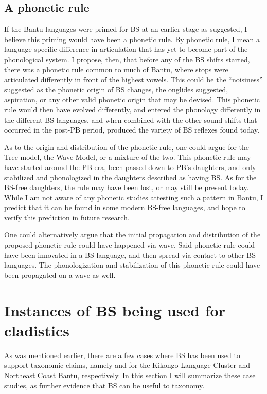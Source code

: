 \documentclass[output=paper,colorlinks,citecolor=brown
]{langscibook}
\begin{document}
\subsection{A phonetic rule}

If the Bantu languages were primed for BS at an earlier stage as \citet{bostoen2008} suggested, I believe this priming would have been a phonetic rule. By phonetic rule, I mean a language-specific difference in articulation that has yet to become part of the phonological system. I propose, then, that before any of the BS shifts started, there was a phonetic rule common to much of Bantu, where stops were articulated differently in front of the highest vowels. This could be the “noisiness” \citet{hyman2003} suggested as the phonetic origin of BS changes, the onglides \citet{Janson2007} suggested, aspiration, or any other valid phonetic origin that may be devised. This phonetic rule would then have evolved differently, and entered the phonology differently in the different BS languages, and when combined with the other sound shifts that occurred in the post-PB period, produced the variety of BS reflexes found today. 

As to the origin and distribution of the phonetic rule, one could argue for the Tree model, the Wave Model, or a mixture of the two. This phonetic rule may have started around the PB era, been passed down to PB’s daughters, and only stabilized and phonologized in the daughters described as having BS. As for the BS-free daughters, the rule may have been lost, or may still be present today. While I am not aware of any phonetic studies attesting such a pattern in Bantu, I predict that it can be found in some modern BS-free languages, and hope to verify this prediction in future research. 

One could alternatively argue that the initial propagation and distribution of the proposed phonetic rule could have happened via wave. Said phonetic rule could have been innovated in a BS-language, and then spread via contact to other BS-languages. The phonologization and stabilization of this phonetic rule could have been propagated on a wave as well. 
	
\section{Instances of BS being used for cladistics}
\label{sec:kieffer:KLC/NEC}

As was mentioned earlier, there are a few cases where BS has been used to support taxonomic claims, namely \citet{bostoen2019} and \citet{hinnebusch1981} for the Kikongo Language Cluster and Northeast Coast Bantu, respectively. In this section I will summarize these case studies, as further evidence that BS can be useful to taxonomy.
\end{document}
